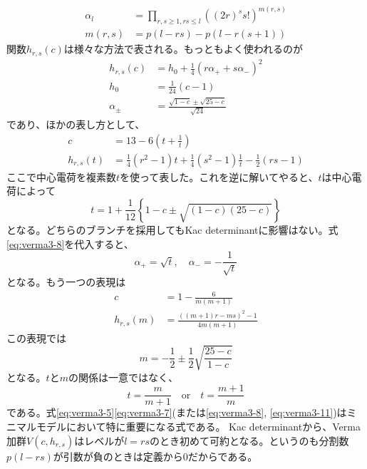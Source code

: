 \documentclass[11pt, aps, longbibliography]{article}
\numberwithin{equation}{section}
\begin{document}
        \begin{align}\label{eq:verma3-6}
            \alpha_l &=  \prod_{r,s\geq 1, rs \leq l} \left( (2r)^s s! \right)^{m(r,s)} \\
            m(r,s) &= p(l-rs) - p(l-r(s+1))
        \end{align}
        関数$h_{r,s}(c)$は様々な方法で表される。もっともよく使われるのが
        \begin{align}\label{eq:verma3-7}
            h_{r,s}(c) &= h_0 + \frac{1}{4}(r\alpha_+ + s\alpha_-)^2 \\
            h_0 &= \frac{1}{24}(c-1) \\
            \alpha_{\pm} &= \frac{\sqrt{1-c}\pm\sqrt{25-c}}{\sqrt{24}}
        \end{align}
        であり、ほかの表し方として、
        \begin{align}\label{eq:verma3-8}
            c &= 13 - 6\left(t+\frac{1}{t}\right) \\
            h_{r,s}(t) &= \frac{1}{4}(r^2-1)t + \frac{1}{4}(s^2-1)\frac{1}{t}- \frac{1}{2}(rs-1)
        \end{align}
        ここで中心電荷を複素数$t$を使って表した。これを逆に解いてやると、$t$は中心電荷によって
        \begin{equation}\label{eq:verma3-9}
            t = 1 + \frac{1}{12}\left\{ 1-c \pm \sqrt{(1-c)(25-c)} \right\}
        \end{equation}
        となる。どちらのブランチを採用してもKac determinantに影響はない。式\eqref{eq:verma3-8}を代入すると、
        \begin{equation}\label{eq:verma3-10}
            \alpha_+ = \sqrt{t}, \quad \alpha_- = -\frac{1}{\sqrt{t}}
        \end{equation}
        となる。もう一つの表現は
        \begin{align}\label{eq:verma3-11}
            c &= 1 - \frac{6}{m(m+1)} \\
            h_{r,s}(m) &= \frac{\left( (m+1)r - ms \right)^2 -1}{4m(m+1)}
        \end{align}
        この表現では
        \begin{equation}\label{eq:verma3-12}
            m = -\frac{1}{2} \pm \frac{1}{2}\sqrt{\frac{25-c}{1-c}}
        \end{equation}
        となる。$t$と$m$の関係は一意ではなく、
        \begin{equation}\label{eq:verma3-13}
            t = \frac{m}{m+1} \quad \text{or} \quad t = \frac{m+1}{m}
        \end{equation}
        である。式\eqref{eq:verma3-5}\eqref{eq:verma3-7}(または\eqref{eq:verma3-8}, \eqref{eq:verma3-11})はミニマルモデルにおいて特に重要になる式である。
        Kac determinantから、Verma加群$V(c,h_{r,s})$はレベルが$l=rs$のとき初めて可約となる。というのも分割数$p(l-rs)$が引数が負のときは定義から0だからである。
\end{document}

